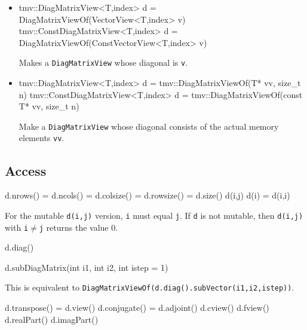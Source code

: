 \documentclass[twoside,letterpaper,11pt]{article}
\renewcommand{\tt}[1]{{\lstinline {#1}}}
\begin{document}
\begin{itemize}
\item
\begin{tmvcode}
tmv::DiagMatrixView<T,index> d = 
      DiagMatrixViewOf(VectorView<T,index> v)
tmv::ConstDiagMatrixView<T,index> d = 
      DiagMatrixViewOf(ConstVectorView<T,index> v)
\end{tmvcode}
Makes a \tt{DiagMatrixView} whose diagonal is \tt{v}.

\item
\begin{tmvcode}
tmv::DiagMatrixView<T,index> d = 
      tmv::DiagMatrixViewOf(T* vv, size_t n)
tmv::ConstDiagMatrixView<T,index> d = 
      tmv::DiagMatrixViewOf(const T* vv, size_t n)
\end{tmvcode}
Make a \tt{DiagMatrixView} whose diagonal consists of the actual memory elements \tt{vv}.

\end{itemize}


\subsection{Access}
\label{DiagMatrix_Access}

\begin{tmvcode}
d.nrows() = d.ncols() = d.colsize() = d.rowsize() = d.size()
d(i,j)
d(i) = d(i,i)
\end{tmvcode}
For the mutable \tt{d(i,j)} version, 
\tt{i} must equal \tt{j}.
If \tt{d} is not mutable, then \tt{d(i,j)} with \tt{i}$\neq$\tt{j} returns the 
value 0.

\begin{tmvcode}
d.diag()
\end{tmvcode}

\begin{tmvcode}
d.subDiagMatrix(int i1, int i2, int istep = 1)
\end{tmvcode}
This is equivalent to \tt{DiagMatrixViewOf(d.diag().subVector(i1,i2,istep))}.
\begin{tmvcode}
d.transpose() = d.view()
d.conjugate() = d.adjoint()
d.cview()
d.fview()
d.realPart()
d.imagPart()
\end{tmvcode}
\end{document}
